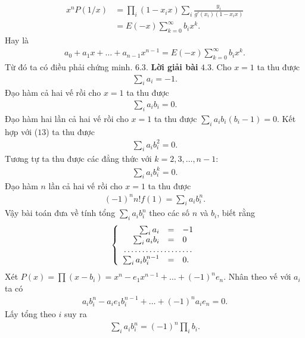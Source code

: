 \begin{multicols}{2}
	\begin{align*}
		x^nP(1/x)&=\prod_i(1-x_i x)\sum_i\frac{y_i}{g'(x_i)(1-x_i x)}\\
		&=E(-x) \sum_{k=0}^\infty b_i x^k.
	\end{align*}
	Hay là
	\begin{align*}
		a_0+a_1 x+\ldots + a_{n-1}x^{n-1}= 
		E(-x) \sum_{k=0}^\infty b_i x^k.
	\end{align*}
	Từ đó ta có điều phải chứng minh. 
	\vskip 0.1cm	
	$\pmb{6.3.}$ \textbf{\color{hoccungpi}Lời giải bài} $\pmb{4.3.}$
	Cho $x=1$ ta thu được 
	\begin{align*}
			\sum_i a_i=-1. \tag{$12$}
	\end{align*}
	Đạo hàm cả hai vế rồi cho $x=1$ ta thu được
	\begin{align*}
		\sum_i a_ib_i=0. \tag{$13$}
	\end{align*}
	Đạo hàm hai lần cả hai vế rồi cho $x=1$ ta thu được
	$ \sum_i a_ib_i(b_i-1)=0$.
	Kết hợp với ($13$) ta thu được
	\begin{align*}
		\sum_i a_ib_i^2 =0. \tag{$14$} 
	\end{align*}
	Tương tự ta thu được các đẳng thức với $k=2,3,\ldots, n-1$:
	\begin{align*}
		\sum_i a_ib_i^k =0. \tag{$15$}
	\end{align*}
	Đạo hàm $n$ lần cả hai vế rồi cho $x=1$ ta thu được
	\begin{align*}
		(-1)^n n! f(1)=\sum_ia_i b_i^n  .
	\end{align*}
	Vậy bài toán đưa về  tính tổng $\sum_i a_ib_i^n $ theo các số $n$ và $b_i$, biết rằng 
	\begin{align*}
		\left\{\begin{array}{rcl}
			\sum_i a_i&=&-1 \\
			\sum_i a_ib_i&=&0\\
			\multicolumn{3}{c}{\dotfill }\\
			\sum_i a_i b_i^{n-1}&=&0.\end{array}\right.
	\end{align*}
	Xét $P(x)=\prod(x-b_i)=x^n-e_1x^{n-1}+\ldots+(-1)^ne_n$. 
	Nhân theo vế với $a_i$  ta có
	\begin{align*}
		a_ib_i^n-a_ie_1b_i^{n-1}+\ldots+(-1)^na_ie_n=0.
	\end{align*}
	Lấy tổng theo $i$ suy ra
	\begin{align*}
		\sum_i a_ib_i^n=(-1)^n\prod_i b_i.
	\end{align*}
\end{multicols}
